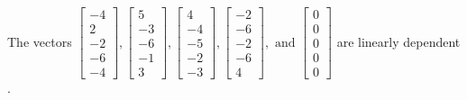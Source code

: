 \begin{exercise}
\begin{exerciseStatement}
  \end{exerciseStatement}
  \begin{exerciseAnswer}
   The vectors \(\left[\begin{array}{r}
-4 \\
2 \\
-2 \\
-6 \\
-4
\end{array}\right] , \left[\begin{array}{r}
5 \\
-3 \\
-6 \\
-1 \\
3
\end{array}\right] , \left[\begin{array}{r}
4 \\
-4 \\
-5 \\
-2 \\
-3
\end{array}\right] , \left[\begin{array}{r}
-2 \\
-6 \\
-2 \\
-6 \\
4
\end{array}\right] , \text{ and } \left[\begin{array}{r}
0 \\
0 \\
0 \\
0 \\
0
\end{array}\right]\) are 
  	 linearly dependent  .
  


  \end{exerciseAnswer}
\end{exercise}
